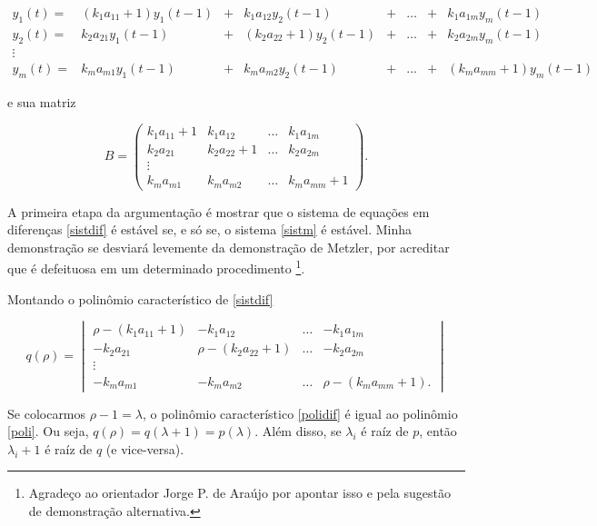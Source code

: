 \documentclass[
	12pt,				%
	openright,			%
	twoside,			%
	a4paper,			%
	english,			%
	french,				%
	spanish,			%
	brazil				%
	]{abntex2}
\begin{document}
\begin{equation} \label{sistdif}
	\begin{matrix}
		y_1(t) =& (k_1a_{11} + 1)y_1(t - 1) &+& k_1a_{12}y_2(t-1) &+& \ldots &+& k_1a_{1m}y_m(t-1) \\
		y_2(t) =& k_2a_{21}y_1(t - 1) &+& (k_2a_{22} + 1)y_2(t-1) &+& \ldots &+& k_2a_{2m}y_m(t-1) \\
		\vdots \\
		y_m(t) =& k_ma_{m1}y_1(t - 1) &+& k_ma_{m2}y_2(t-1) &+& \ldots &+& (k_ma_{mm} + 1)y_m(t-1)
	\end{matrix}
\end{equation}

e sua matriz

\begin{equation} \label{matrizdif}
	B =
	\begin{pmatrix}
		k_1a_{11} + 1 & k_1a_{12} & \ldots & k_1a_{1m} \\
		k_2a_{21} & k_2a_{22} + 1 & \ldots & k_2a_{2m} \\
		\vdots \\
		k_ma_{m1} & k_ma_{m2} & \ldots & k_ma_{mm} + 1
	\end{pmatrix}.
\end{equation}

A primeira etapa da argumentação é mostrar que o sistema de equações em diferenças \ref{sistdif} é estável
se, e só se, o sistema \ref{sistm} é estável. Minha demonstração se desviará
levemente da demonstração de Metzler, por acreditar que é defeituosa
em um determinado procedimento \footnote{Agradeço ao orientador Jorge P. de Araújo por apontar
isso e pela sugestão de demonstração alternativa.}.

Montando o polinômio característico de \ref{sistdif}

\begin{equation} \label{polidif}
	q(\rho) =
	\begin{vmatrix}
		\rho - (k_1a_{11} + 1) & - k_1a_{12} & \ldots & - k_1a_{1m} \\
		- k_2a_{21} & \rho - (k_2a_{22} + 1) & \ldots & - k_2a_{2m} \\
		\vdots \\
		- k_ma_{m1} & - k_ma_{m2} & \ldots & \rho - (k_ma_{mm} + 1).
	\end{vmatrix}
\end{equation}

Se colocarmos $\rho - 1 = \lambda$, o polinômio característico \ref{polidif} é igual
ao polinômio \ref{poli}. Ou seja, $q(\rho) = q(\lambda + 1) = p(\lambda)$. Além disso,
se $\lambda_i$ é raíz de $p$, então $\lambda_i + 1$ é raíz de $q$ (e vice-versa).
\end{document}
